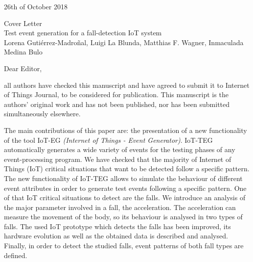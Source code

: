 \documentclass[parskip]{scrartcl}
\begin{document}
 
\pagestyle{empty}

\begin{flushright}
    \Large
    26th of October 2018
\end{flushright}

\begin{center}
    \huge
    Cover Letter\\
    \vspace{0.4cm}
    \LARGE
    Test event generation for a fall-detection IoT system\\
    \vspace{0.4cm}
    \large
    Lorena Gutiérrez-Madroñal, Luigi La Blunda, Matthias F. Wagner, Inmaculada Medina Bulo
\end{center}
 
    \vspace{0.8cm}

    \normalsize
Dear Editor,

all authors have checked this manuscript and have agreed to submit it to Internet of Things Journal, to be considered for publication.
This manuscript is the authors' original work and has not been published, nor has been submitted simultaneously elsewhere.

The main contributions of this paper are:
the presentation of a new functionality of the tool IoT-EG \textit{(Internet of Things - Event Generator)}. IoT-TEG automatically 
generates a wide variety of events for the testing phases of any event-processing program. We have checked that the majority of 
Internet of Things (IoT) critical situations that want to be detected follow a specific pattern. The new functionality of IoT-TEG 
allows to simulate the behaviour of different event attributes in order to generate test events following a specific pattern. 
One of that IoT critical situations to detect are the falls. We introduce an analysis of the major parameter involved in a fall, 
the acceleration. The acceleration can measure the movement of the body, so its behaviour is analysed in two types of falls. 
The used IoT prototype which detects the falls has been improved, its hardware evolution as well as the obtained data is described 
and analysed. Finally, in order to detect the studied falls, event patterns of both fall types are defined.
\end{document}

